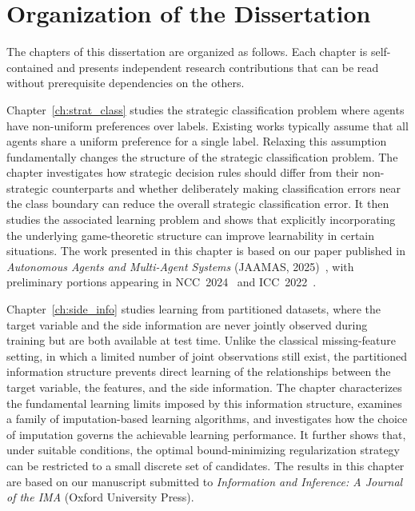 \section*{Organization of the Dissertation}
\label{sec:intro_contrib}

The chapters of this dissertation are organized as follows. Each chapter is self-contained and presents independent research contributions that can be read without prerequisite dependencies on the others.

Chapter~\ref{ch:strat_class} studies the strategic classification problem where agents have non-uniform preferences over labels. Existing works typically assume that all agents share a uniform preference for a single label. Relaxing this assumption fundamentally changes the structure of the strategic classification problem. The chapter investigates how strategic decision rules should differ from their non-strategic counterparts and whether deliberately making classification errors near the class boundary can reduce the overall strategic classification error. It then studies the associated learning problem and shows that explicitly incorporating the underlying game-theoretic structure can improve learnability in certain situations. The work presented in this chapter is based on our paper published in \emph{Autonomous Agents and Multi-Agent Systems} (JAAMAS, 2025)~\cite{singh2025strategic}, with preliminary portions appearing in NCC~2024~\cite{singh2024optimal} and ICC~2022~\cite{singh22strategic}.

Chapter~\ref{ch:side_info} studies learning from partitioned datasets, where the target variable and the side information are never jointly observed during training but are both available at test time. Unlike the classical missing-feature setting, in which a limited number of joint observations still exist, the partitioned information structure prevents direct learning of the relationships between the target variable, the features, and the side information. The chapter characterizes the fundamental learning limits imposed by this information structure, examines a family of imputation-based learning algorithms, and investigates how the choice of imputation governs the achievable learning performance. It further shows that, under suitable conditions, the optimal bound-minimizing regularization strategy can be restricted to a small discrete set of candidates. The results in this chapter are based on our manuscript submitted to \emph{Information and Inference: A Journal of the IMA} (Oxford University Press).

